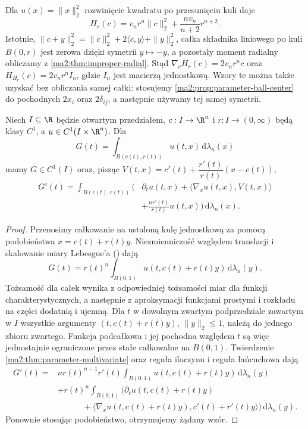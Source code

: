 \begin{przyklad}
\label{ma2:ex:parameter-ball-moment}
Dla $u(x)=\|x\|_2^2$ rozwinięcie kwadratu
po przesunięciu kuli daje
\[
 H_r(c)=v_nr^n\|c\|_2^2+
 \frac{nv_n}{n+2}r^{n+2}.
\]
Istotnie, $\|c+y\|_2^2=\|c\|_2^2+2\langle c,y\rangle+
\|y\|_2^2$, całka składnika liniowego po kuli
$B(0,r)$ jest zerowa dzięki symetrii $y\mapsto-y$,
a pozostały moment radialny obliczamy z
\ref{ma2:thm:improper-radial}.
Stąd $\nabla_c H_r(c)=2v_nr^n c$ oraz
$H_{H_r}(c)=2v_nr^n I_n$, gdzie $I_n$ jest
macierzą jednostkową. Wzory te można także
uzyskać bez obliczania samej całki:
stosujemy \ref{ma2:prop:parameter-ball-center}
do pochodnych $2x_i$ oraz $2\delta_{ij}$,
a następnie używamy tej samej symetrii.
\end{przyklad}

\begin{stwierdzenie}
\label{ma2:prop:parameter-ball-all}
Niech $I\subseteq\R$ będzie otwartym przedziałem,
$c:I\to\R^n$ i $r:I\to(0,\infty)$ będą klasy $C^1$,
a $u\in C^1(I\times\R^n)$. Dla
\[
 G(t)=\int_{B(c(t),r(t))}u(t,x)\,\mathrm d\lambda_n(x)
\]
mamy $G\in C^1(I)$ oraz, pisząc
$V(t,x)=c'(t)+\dfrac{r'(t)}{r(t)}(x-c(t))$,
\[
 \begin{aligned}
 G'(t)=\int_{B(c(t),r(t))}
 \bigg(&\partial_t u(t,x)+
 \langle\nabla_x u(t,x),V(t,x)\rangle\\
 &+\frac{nr'(t)}{r(t)}u(t,x)\bigg)
 \,\mathrm d\lambda_n(x).
 \end{aligned}
\]
\end{stwierdzenie}
\begin{proof}
Przenosimy całkowanie na ustaloną kulę jednostkową
za pomocą podobieństwa $x=c(t)+r(t)y$.
Niezmienniczość względem translacji i skalowanie
miary Lebesgue'a
()
dają
\[
 G(t)=r(t)^n\int_{B(0,1)}
 u(t,c(t)+r(t)y)\,\mathrm d\lambda_n(y).
\]
Tożsamość dla całek wynika z odpowiedniej
tożsamości miar dla funkcji charakterystycznych,
a następnie z aproksymacji funkcjami prostymi
i rozkładu na części dodatnią i ujemną.
Dla $t$ w dowolnym zwartym podprzedziale
zawartym w $I$ wszystkie argumenty $(t,c(t)+r(t)y)$,
$\|y\|_2\le1$, należą do jednego zbioru
zwartego. Funkcja podcałkowa i jej pochodna
względem $t$ są więc jednostajnie ograniczone
przez stałe całkowalne na $B(0,1)$.
Twierdzenie \ref{ma2:thm:parameter-multivariate}
oraz reguła iloczynu i reguła łańcuchowa dają
\[
 \begin{aligned}
 G'(t)={}&nr(t)^{n-1}r'(t)
 \int_{B(0,1)}u(t,c(t)+r(t)y)\,\mathrm d\lambda_n(y)\\
 &+r(t)^n\int_{B(0,1)}
 \big(\partial_t u(t,c(t)+r(t)y)\\
 &\hspace{3em}+\langle\nabla_x u(t,c(t)+r(t)y),
 c'(t)+r'(t)y\rangle\big)\,\mathrm d\lambda_n(y).
 \end{aligned}
\]
Ponownie stosując podobieństwo,
otrzymujemy żądany wzór.
\end{proof}

